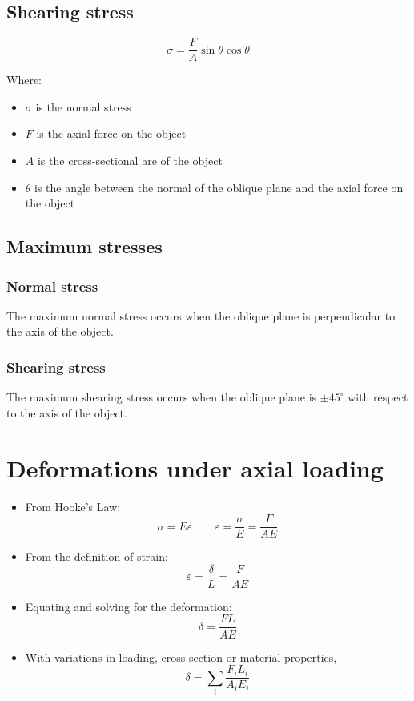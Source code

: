 \documentclass[11pt]{article}
\begin{document}
\subsection{Shearing stress}
\label{sec:org8fe4f71}
\[\sigma = \frac{F}{A} \sin \theta \cos \theta\]

Where:
\begin{itemize}
\item \(\sigma\) is the normal stress
\item \(F\) is the axial force on the object
\item \(A\) is the cross-sectional are of the object
\item \(\theta\) is the angle between the normal of the oblique plane and the axial force on the object
\end{itemize}

\subsection{Maximum stresses}
\label{sec:orgd54a8f3}

\subsubsection{Normal stress}
\label{sec:org16974f2}
The maximum normal stress occurs when the oblique plane is perpendicular to the axis of the object.

\subsubsection{Shearing stress}
\label{sec:org12701d7}
The maximum shearing stress occurs when the oblique plane is \(\pm 45^{\circ}\) with respect to the axis of the object.


\section{Deformations under axial loading}
\label{sec:orge7c72fa}
\begin{itemize}
\item From Hooke's Law:
\[\sigma = E \varepsilon \qquad \varepsilon = \frac{\sigma}{E} = \frac{F}{AE}\]

\item From the definition of strain:
\[\varepsilon = \frac{\delta}{L} = \frac{F}{AE}\]

\item Equating and solving for the deformation:
\[\delta = \frac{FL}{AE}\]

\item With variations in loading, cross-section or material properties,
\[\delta = \sum_i \frac{F_i L_i}{A_i E_i}\]
\end{itemize}
\end{document}
